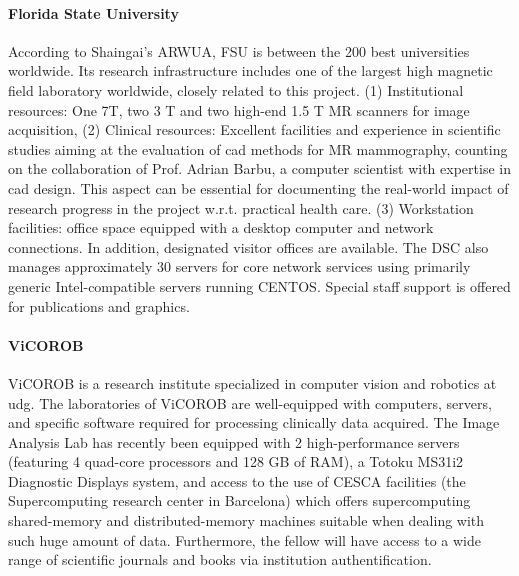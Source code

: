 \paragraph{Florida State University} 
According to Shaingai's ARWUA, FSU is between the 200 best universities worldwide. 
Its research infrastructure includes one of the largest high magnetic field laboratory worldwide, closely related to this project. 
(1) Institutional resources: One 7T, two 3 T and two high-end 1.5 T MR scanners for image acquisition, (2) Clinical resources: Excellent facilities and experience in scientific studies aiming at the evaluation of \ac{cad} methods for MR mammography, counting on the collaboration of Prof. Adrian Barbu, a computer scientist with expertise in \ac{cad} design. 
This aspect can be essential for documenting the real-world impact of research progress in the project w.r.t. practical health care. 
(3) Workstation facilities: office space equipped with a desktop computer and network connections. 
In addition, designated visitor offices are available. 
The DSC also manages approximately 30 servers for core network services using primarily generic Intel-compatible servers running CENTOS. 
Special staff support is offered for publications and graphics.

\paragraph{ViCOROB}
ViCOROB is a research institute specialized in computer vision and robotics at \ac{udg}.
The laboratories of ViCOROB are well-equipped with computers, servers, and specific software required for processing clinically data acquired. 
The Image Analysis Lab has recently been equipped with 2 high-performance servers (featuring 4 quad-core processors and 128 GB of RAM), a Totoku MS31i2 Diagnostic Displays system, and access to the use of CESCA facilities (the Supercomputing research center in Barcelona) which offers supercomputing shared-memory and distributed-memory machines suitable when dealing with such huge amount of data.
Furthermore, the fellow will have access to a wide range of scientific journals and books via institution authentification.


